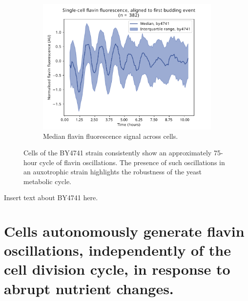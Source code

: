\begin{figure}
\begin{subfigure}[htpb]{0.4\textwidth}
  \end{subfigure}%
  \begin{subfigure}[htpb]{0.4\textwidth}
   \centering
   \includegraphics[width=\textwidth]{by4741_491_6}
   \caption{
    Median flavin fluorescence signal across cells.%
   }
   \label{fig:biology-by4741-sync-median}
  \end{subfigure}

  \caption{
    Cells of the BY4741 strain consistently show an approximately 75-hour cycle of flavin oscillations.
    The presence of such oscillations in an auxotrophic strain highlights the robustness of the yeast metabolic cycle.
  }
  \label{fig:biology-by4741-sync}
\end{figure}

Insert text about BY4741 here.


\section[Abrupt nutrient changes]{Cells autonomously generate flavin oscillations, independently of the cell division cycle, in response to abrupt nutrient changes.}
\label{sec:biology-abrupt}

